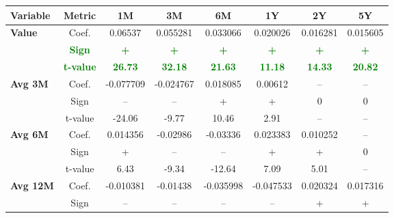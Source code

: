 \documentclass[11pt,english,a4paper,hidelinks]{book}
\begin{document}
\begin{table}[H]
    \centering
    \begin{tabular}{lccccccc}
        \toprule
        \textbf{Variable} & \textbf{Metric} & \textbf{1M} & \textbf{3M} & \textbf{6M} & \textbf{1Y} & \textbf{2Y} & \textbf{5Y} \\
        \midrule
        \multirow{3}{*}{\textbf{Value}}
            & Coef.   & 0.06537  & 0.055281 & 0.033066 & 0.020026 & 0.016281 & 0.015605 \\
            & \textbf{\textcolor{green}{Sign}}
                     & \textbf{\textcolor{green}{+}}
                     & \textbf{\textcolor{green}{+}}
                     & \textbf{\textcolor{green}{+}}
                     & \textbf{\textcolor{green}{+}}
                     & \textbf{\textcolor{green}{+}}
                     & \textbf{\textcolor{green}{+}} \\
            & \textbf{\textcolor{green}{t-value}}
                     & \textbf{\textcolor{green}{26.73}}
                     & \textbf{\textcolor{green}{32.18}}
                     & \textbf{\textcolor{green}{21.63}}
                     & \textbf{\textcolor{green}{11.18}}
                     & \textbf{\textcolor{green}{14.33}}
                     & \textbf{\textcolor{green}{20.82}} \\
        \cmidrule{1-8}
        \multirow{3}{*}{\textbf{Avg 3M}}
            & Coef.   & -0.077709 & -0.024767 & 0.018085  & 0.00612   & --        & --        \\
            & Sign    & –         & –         & +         & +         & 0         & 0         \\
            & t-value & -24.06    & -9.77     & 10.46     & 2.91      & --        & --        \\
        \cmidrule{1-8}
        \multirow{3}{*}{\textbf{Avg 6M}}
            & Coef.   & 0.014356  & -0.02986  & -0.03336  & 0.023383  & 0.010252  & --        \\
            & Sign    & +         & –         & –         & +         & +         & 0         \\
            & t-value & 6.43      & -9.34     & -12.64    & 7.09      & 5.01      & --        \\
        \cmidrule{1-8}
        \multirow{3}{*}{\textbf{Avg 12M}}
            & Coef.   & -0.010381 & -0.01438  & -0.035998 & -0.047533 & 0.020324  & 0.017316  \\
            & Sign    & –         & –         & –         & –         & +         & +         \\

\end{tabular}
\end{table}
\end{document}
